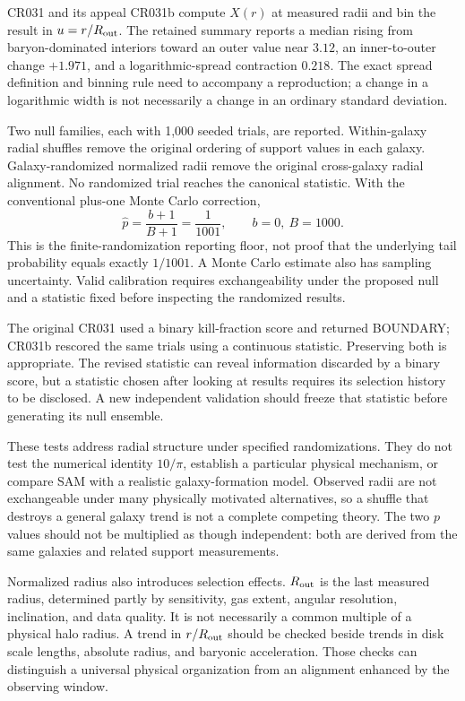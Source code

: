 CR031 and its appeal CR031b compute $X(r)$ at measured radii and bin the result in $u=r/R_{\rm out}$. The retained summary reports a median rising from baryon-dominated interiors toward an outer value near $3.12$, an inner-to-outer change $+1.971$, and a logarithmic-spread contraction $0.218$. The exact spread definition and binning rule need to accompany a reproduction; a change in a logarithmic width is not necessarily a change in an ordinary standard deviation.

Two null families, each with 1,000 seeded trials, are reported. Within-galaxy radial shuffles remove the original ordering of support values in each galaxy. Galaxy-randomized normalized radii remove the original cross-galaxy radial alignment. No randomized trial reaches the canonical statistic. With the conventional plus-one Monte Carlo correction,
\begin{equation}
 \widehat p=\frac{b+1}{B+1}=\frac{1}{1001},\qquad b=0,\ B=1000.
 \label{c10:permutation}
\end{equation}
This is the finite-randomization reporting floor, not proof that the underlying tail probability equals exactly $1/1001$. A Monte Carlo estimate also has sampling uncertainty. Valid calibration requires exchangeability under the proposed null and a statistic fixed before inspecting the randomized results.

The original CR031 used a binary kill-fraction score and returned BOUNDARY; CR031b rescored the same trials using a continuous statistic. Preserving both is appropriate. The revised statistic can reveal information discarded by a binary score, but a statistic chosen after looking at results requires its selection history to be disclosed. A new independent validation should freeze that statistic before generating its null ensemble.

These tests address radial structure under specified randomizations. They do not test the numerical identity $10/\pi$, establish a particular physical mechanism, or compare SAM with a realistic galaxy-formation model. Observed radii are not exchangeable under many physically motivated alternatives, so a shuffle that destroys a general galaxy trend is not a complete competing theory. The two $p$ values should not be multiplied as though independent: both are derived from the same galaxies and related support measurements.

Normalized radius also introduces selection effects. $R_{\rm out}$ is the last measured radius, determined partly by sensitivity, gas extent, angular resolution, inclination, and data quality. It is not necessarily a common multiple of a physical halo radius. A trend in $r/R_{\rm out}$ should be checked beside trends in disk scale lengths, absolute radius, and baryonic acceleration. Those checks can distinguish a universal physical organization from an alignment enhanced by the observing window.

